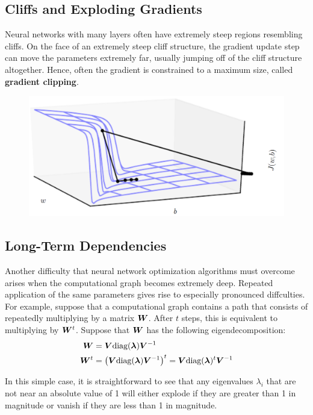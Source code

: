 \begin{multicols}{2}
	\subsection{Cliffs and Exploding Gradients}
	Neural networks with many layers often have extremely steep regions resembling cliffs.
	On the face of an extremely steep cliff structure, the gradient update step can move the parameters extremely far, usually jumping off of the cliff structure altogether.
	Hence, often the gradient is constrained to a maximum size, called \textbf{gradient clipping}.
	\begin{figure}[H]
		\centering
		\includegraphics[width=0.9\linewidth]{images/cliff.png}
	\end{figure}
	
	
	\subsection{Long-Term Dependencies}
	Another difficulty that neural network optimization algorithms must overcome arises when the computational graph becomes extremely deep.
	Repeated application of the same parameters gives rise to especially pronounced diffculties.
	For example, suppose that a computational graph contains a path that consists of repeatedly multiplying by a matrix ${\bm{W}}$.
	After $t$ steps, this is equivalent to multiplying by ${\bm{W}}^t$.
	Suppose that ${\bm{W}}$ has the following eigendecomposition:
	\begin{align*}
	\mW &= \mV \diag(\bol{\lambda})\mV^{-1}\\
	\mW^t &= \left(\mV \diag(\bol{\lambda})\mV^{-1}\right)^t = \mV \diag(\bol{\lambda})^t\mV^{-1}
 	\end{align*}

	
	In this simple case, it is straightforward to see that any eigenvalues $\lambda_i$ that are not near an absolute value of 1 will either explode if they are greater than 1 in magnitude or vanish if they are less than 1 in magnitude.\\
	

\end{multicols}
